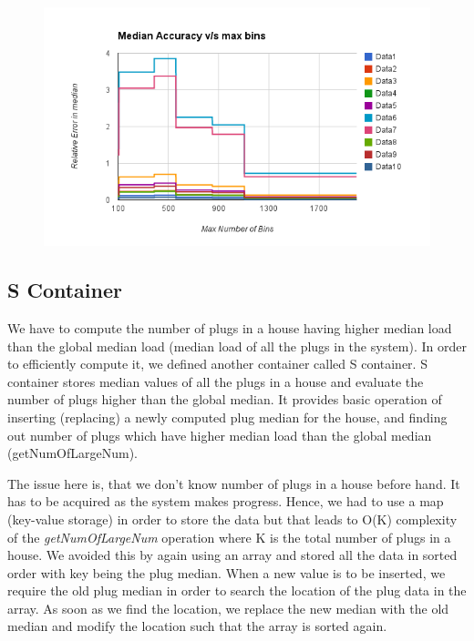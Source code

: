 \begin{figure}[h]
\begin{center}
\includegraphics[scale=0.4]{img/bin_size_experiment}
\end{center}
\end{figure}

\subsection{S Container}
We have to compute the number of plugs in a house having higher median load than the global median load (median load of all the plugs in the system). In order to efficiently compute it, we defined another container called S container. S container stores median values of all the plugs in a house and evaluate the number of plugs higher than the global median. It provides basic operation of inserting (replacing) a newly computed plug median for the house, and finding out number of plugs which have higher median load than the global median (getNumOfLargeNum).

The issue here is, that we don't know number of plugs in a house before hand. It has to be acquired as the system makes progress. Hence, we had to use a map (key-value storage) in order to store the data but that leads to O(K) complexity of the \textit{getNumOfLargeNum} operation where K is the total number of plugs in a house. We avoided this by again using an array and stored all the data in sorted order with key being the plug median. When a new value is to be inserted, we require the old plug median in order to search the location of the plug data in the array. As soon as we find the location, we replace the new median with the old median and modify the location such that the array is sorted again.

